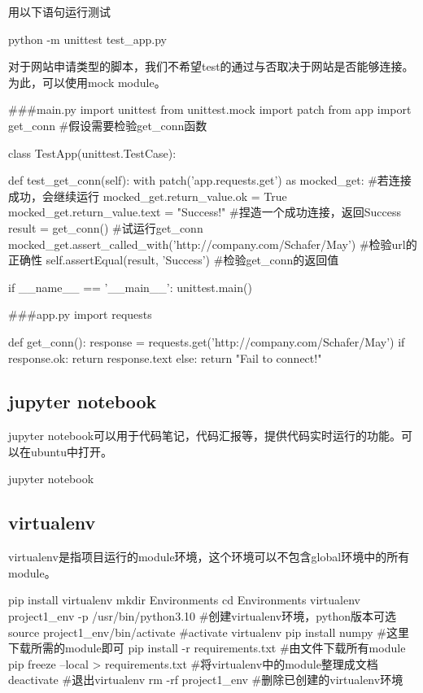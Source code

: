     用以下语句运行测试
    \begin{codeblock}[language=bash, caption={run unittest}]
      python -m unittest test_app.py
    \end{codeblock}

    对于网站申请类型的脚本，我们不希望test的通过与否取决于网站是否能够连接。
    为此，可以使用mock module。
    \begin{codeblock}[language=python, caption={mock module}]
      #\#\#main.py
      import unittest
      from unittest.mock import patch
      from app import get_conn #假设需要检验get\_conn函数

      class TestApp(unittest.TestCase):
        
          def test_get_conn(self):
              with patch('app.requests.get') as mocked_get: #若连接成功，会继续运行
                  mocked_get.return_value.ok = True
                  mocked_get.return_value.text = "Success!" #捏造一个成功连接，返回Success
                  result = get_conn() #试运行get\_conn
                  mocked_get.assert_called_with('http://company.com/Schafer/May') 
                      #检验url的正确性
                  self.assertEqual(result, 'Success') #检验get\_conn的返回值

      if __name__ == '__main__':
          unittest.main()

      #\#\#app.py
      import requests

      def get_conn():
          response = requests.get('http://company.com/Schafer/May')
          if response.ok:
              return response.text
          else:
              return "Fail to connect!"
    \end{codeblock}

  \subsection{jupyter notebook}
    jupyter notebook可以用于代码笔记，代码汇报等，提供代码实时运行的功能。可以在ubuntu中打开。
    \begin{codeblock}[language=bash, caption={run jupyter notebok}]
      jupyter notebook
    \end{codeblock}

  \subsection{virtualenv}
    virtualenv是指项目运行的module环境，这个环境可以不包含global环境中的所有module。
    \begin{codeblock}[language=bash, caption={setup virtualenv}]
      pip install virtualenv 
      mkdir Environments
      cd Environments
      virtualenv project1_env -p /usr/bin/python3.10 #创建virtualenv环境，python版本可选
      source project1_env/bin/activate #activate virtualenv
      pip install numpy #这里下载所需的module即可
      pip install -r requirements.txt #由文件下载所有module 
      pip freeze --local > requirements.txt #将virtualenv中的module整理成文档
      deactivate #退出virtualenv
      rm -rf project1_env #删除已创建的virtualenv环境
    \end{codeblock}

